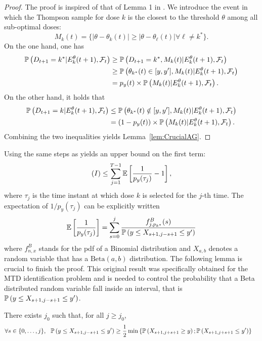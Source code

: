 \begin{proof} The proof is inspired of that of Lemma 1 in \cite{AGAISTAT13}. We introduce the event in which the Thompson sample for dose $k$ is the closest to the threshold $\theta$ among all sub-optimal doses:
\[M_k(t) = \{ |\theta - \theta_k(t)| \geq |\theta - \theta_\ell(t)| \forall \ell \neq k^*\}.\]
On the one hand, one has
\begin{align*}
 \mathbb{P}\left(D_{t+1} = k^* | E_k^\theta(t+1),\mathcal{F}_t\right)& \geq
 	\mathbb{P}\left(D_{t+1} = k^*,M_k(t) | E_k^\theta(t+1),\mathcal{F}_t\right)
 \\ & \geq
   \mathbb{P}\left(\theta_{k^*}(t) \in [y,y'],M_k(t) | E_k^\theta(t+1),\mathcal{F}_t\right) 
\\ & =
	p_y(t) \times \mathbb{P}\left(M_k(t) | E_k^\theta(t+1),\mathcal{F}_t\right).
\end{align*}
On the other hand, it holds that 
\begin{align*} \mathbb{P}\left(D_{t+1} = k | E_k^\theta(t+1),\mathcal{F}_t\right)
 & \leq \mathbb{P}\left(\theta_{k^*}(t) \notin [y, y'], M_k(t) | E_k^\theta(t+1),\mathcal{F}_t\right)
\\ & = (1 - p_y(t)) \times \mathbb{P}\left(M_k(t) | E_k^\theta(t+1),\mathcal{F}_t\right).
\end{align*}
Combining the two inequalities yields Lemma~\ref{lem:CrucialAG}.
\end{proof}

Using the same steps as \cite{AGAISTAT13} yields an upper bound on the first term:
\[(I) \leq \sum_{j=1}^{T-1}\mathbb{E}\left[\frac{1}{p_y(\tau_{j})} - 1\right],\]
where $\tau_j$ is the time instant at which dose $k$ is selected for the $j$-th time. The expectation of $1/p_y(\tau_{j})$ can be explicitly written 
\[\mathbb{E}\left[\frac{1}{p_y(\tau_{j})}\right] =\sum_{s=0}^j \frac{f^B_{j,p_{k^*}}(s)}{\mathbb{P}\left(y \leq X_{s+1,j-s+1} \leq y'\right)} \]
where $f^B_{n,x}$ stands for the pdf of a Binomial distribution and $X_{a,b}$ denotes a random variable that has a $\mathrm{Beta}(a,b)$ distribution. The following lemma is crucial to finish the proof. This original result was specifically obtained for the MTD identification problem and is needed to control the probability that a Beta distributed random variable fall inside an interval, that is $\mathbb{P}\left(y \leq X_{s+1,j-s+1} \leq y'\right)$.


\begin{lemma}\label{lem:Technical} There exists $j_0$ such that, for all $j \geq j_0$,
\begin{align*}
&\forall s \in \{0,\dots, j\}, \ \ \mathbb{P}\left(y \leq X_{s+1,j-s+1} \leq y'\right) \geq \frac{1}{2}\min  \left\{\mathbb{P}\left(X_{s+1,j+s+1} \geq y\right) ; \mathbb{P}\left(X_{s+1,j+s+1} \leq y'\right)\right\}
\end{align*}
\end{lemma}

